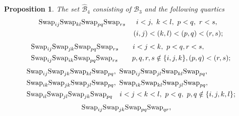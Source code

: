 \documentclass[12pt,dvipsnames,accepted=2016-08-18,a4paper,onecolumn]{quantumarticle}
\numberwithin{equation}{section}
\newcommand{\cB}{\mathcal B}
\newtheorem{proposition}[theorem]{Proposition}
\theoremstyle{definition}
\begin{document}
	
\begin{proposition}\label{prop:basis43}
    The set $\hat{\cB}_4$  consisting of $\cB_3$ and the following quartics
    \begin{equation}\label{3:2+2+2+2}
        \begin{split}
            \textnormal{Swap}_{ij} \textnormal{Swap}_{kl} \textnormal{Swap}_{pq} \textnormal{Swap}_{rs} \quad \ \,
			&i < j, \ k < l,\  p < q,\ r < s,  \\ (&i,j) < (k,l) < (p,q)<(r,s);\\
        \end{split}
    \end{equation}
    \vspace{2mm}
    \begin{equation}\label{3:3+2+2}
        \begin{split}
            &\textnormal{Swap}_{ij} \textnormal{Swap}_{jk} \textnormal{Swap}_{pq} \textnormal{Swap}_{rs}\quad \quad  i < j < k,\  p<q, r<s, \\
			 &\textnormal{Swap}_{ij} \textnormal{Swap}_{ik} \textnormal{Swap}_{pq} \textnormal{Swap}_{rs}  \quad\quad p,q,r,s \notin \{i,j,k\}, (p,q)<(r,s);\\
        \end{split}
     \end{equation}
      \vspace{2mm}
     \begin{equation}\label{3:4+2}
         \begin{split}
             &\textnormal{Swap}_{ij} \textnormal{Swap}_{jk} \textnormal{Swap}_{kl} \textnormal{Swap}_{pq} , \ 
	\textnormal{Swap}_{ij} \textnormal{Swap}_{jl} \textnormal{Swap}_{kl} \textnormal{Swap}_{pq},\\
	&\textnormal{Swap}_{ik} \textnormal{Swap}_{jk} \textnormal{Swap}_{jl} \textnormal{Swap}_{pq},\ 
	\textnormal{Swap}_{ik} \textnormal{Swap}_{kl} \textnormal{Swap}_{jl} \textnormal{Swap}_{pq},\\
	&\textnormal{Swap}_{il} \textnormal{Swap}_{jl} \textnormal{Swap}_{jk}\textnormal{Swap}_{pq}
	\quad i < j < k < l,\ p<q,\ p,q \notin \{i,j,k,l\};\\
         \end{split}
     \end{equation}
      \vspace{2mm}
        \begin{equation}\label{3:3+3}
            \begin{split}
                	\textnormal{Swap}_{ij} \textnormal{Swap}_{jk} \textnormal{Swap}_{pq} \textnormal{Swap}_{qr}&, \ 

\end{split}
\end{equation}
\end{proposition}
\end{document}
